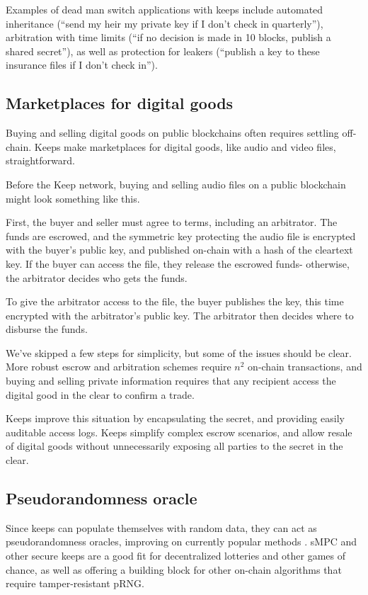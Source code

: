 \documentclass[11pt]{article}
\begin{document}
Examples of dead man switch applications with keeps include automated
inheritance (“send my heir my private key if I don’t check in
quarterly”), arbitration with time limits (“if no decision is made in
10 blocks, publish a shared secret”), as well as protection for
leakers (“publish a key to these insurance files if I don’t check
in”).

\subsection{Marketplaces for digital goods}

Buying and selling digital goods on public blockchains often requires
settling off-chain. Keeps make marketplaces for digital goods, like
audio and video files, straightforward.

Before the Keep network, buying and selling audio files on a public
blockchain might look something like this.

First, the buyer and seller must agree to terms, including an
arbitrator. The funds are escrowed, and the symmetric key protecting
the audio file is encrypted with the buyer’s public key, and published
on-chain with a hash of the cleartext key. If the buyer can access the
file, they release the escrowed funds- otherwise, the arbitrator
decides who gets the funds.

To give the arbitrator access to the file, the buyer publishes the
key, this time encrypted with the arbitrator’s public key. The
arbitrator then decides where to disburse the funds.

We’ve skipped a few steps for simplicity, but some of the issues
should be clear. More robust escrow and arbitration schemes require
${n^2}$ on-chain transactions, and buying and selling private
information requires that any recipient access the digital good in the
clear to confirm a trade.

Keeps improve this situation by encapsulating the secret, and
providing easily auditable access logs. Keeps simplify complex escrow
scenarios, and allow resale of digital goods without unnecessarily
exposing all parties to the secret in the clear.

\subsection{Pseudorandomness oracle}

Since keeps can populate themselves with random data, they can act as
pseudorandomness oracles, improving on currently popular methods
\cite{prngStackexchange}. sMPC and other secure keeps are a good fit for
decentralized lotteries and other games of chance, as well as offering
a building block for other on-chain algorithms that require
tamper-resistant pRNG.
\end{document}
